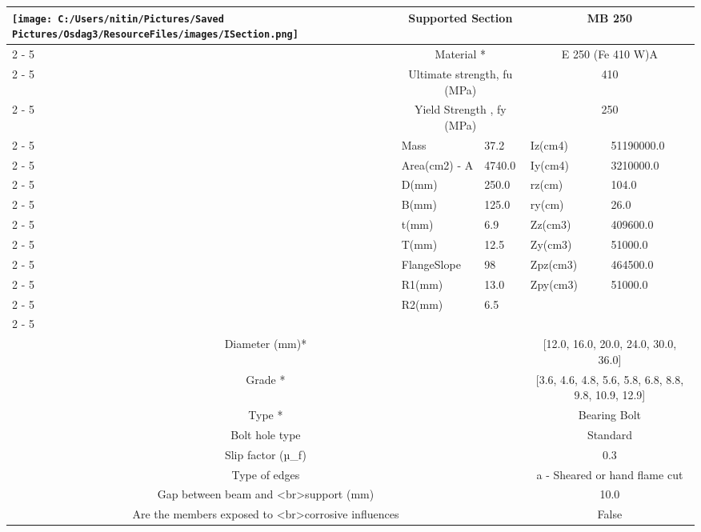 \documentclass{article}%
\begin{document}
\begin{longtable}{|p{5cm}|p{2cm}|p{2cm}|p{2cm}|p{5cm}|}
\hline%
\hline%
\multirow{13}{*}{\texttt{[image: C:/Users/nitin/Pictures/Saved Pictures/Osdag3/ResourceFiles/images/ISection.png]}}&\multicolumn{2}{|c|}{Supported Section}&\multicolumn{2}{|c|}{MB 250}\\%
\cline{2%
-%
5}%
&\multicolumn{2}{|c|}{Material *}&\multicolumn{2}{|c|}{E 250 (Fe 410 W)A}\\%
\cline{2%
-%
5}%
&\multicolumn{2}{|c|}{Ultimate strength, fu (MPa)}&\multicolumn{2}{|c|}{410}\\%
\cline{2%
-%
5}%
&\multicolumn{2}{|c|}{Yield Strength , fy (MPa)}&\multicolumn{2}{|c|}{250}\\%
\cline{2%
-%
5}%
&Mass&37.2&Iz(cm4)&51190000.0\\%
\cline{2%
-%
5}%
&Area(cm2) {-} A&4740.0&Iy(cm4)&3210000.0\\%
\cline{2%
-%
5}%
&D(mm)&250.0&rz(cm)&104.0\\%
\cline{2%
-%
5}%
&B(mm)&125.0&ry(cm)&26.0\\%
\cline{2%
-%
5}%
&t(mm)&6.9&Zz(cm3)&409600.0\\%
\cline{2%
-%
5}%
&T(mm)&12.5&Zy(cm3)&51000.0\\%
\cline{2%
-%
5}%
&FlangeSlope&98&Zpz(cm3)&464500.0\\%
\cline{2%
-%
5}%
&R1(mm)&13.0&Zpy(cm3)&51000.0\\%
\cline{2%
-%
5}%
&R2(mm)&6.5&&\\%
\cline{2%
-%
5}%
\hline%
\multicolumn{5}{|c|}{\textbf{Bolt Details}}\\%
\hline%
\hline%
\multicolumn{3}{|c|}{Diameter (mm)*}&\multicolumn{2}{|c|}{{[}12.0, 16.0, 20.0, 24.0, 30.0, 36.0{]}}\\%
\hline%
\hline%
\multicolumn{3}{|c|}{Grade *}&\multicolumn{2}{|c|}{{[}3.6, 4.6, 4.8, 5.6, 5.8, 6.8, 8.8, 9.8, 10.9, 12.9{]}}\\%
\hline%
\hline%
\multicolumn{3}{|c|}{Type *}&\multicolumn{2}{|c|}{Bearing Bolt}\\%
\hline%
\hline%
\multicolumn{3}{|c|}{Bolt hole type}&\multicolumn{2}{|c|}{Standard}\\%
\hline%
\hline%
\multicolumn{3}{|c|}{Slip factor (µ\_f)}&\multicolumn{2}{|c|}{0.3}\\%
\hline%
\hline%
\multicolumn{3}{|c|}{Type of edges}&\multicolumn{2}{|c|}{a {-} Sheared or hand flame cut}\\%
\hline%
\hline%
\multicolumn{3}{|c|}{Gap between beam and <br>support (mm)}&\multicolumn{2}{|c|}{10.0}\\%
\hline%
\hline%
\multicolumn{3}{|c|}{Are the members exposed to <br>corrosive influences}&\multicolumn{2}{|c|}{False}\\%

\end{longtable}
\end{document}
